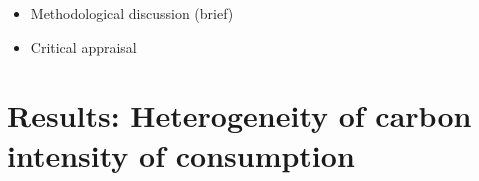 \documentclass[12pt, a4paper]{article}
\begin{document}
\begin{itemize}
    \item Methodological discussion (brief)
    \item Critical appraisal
\end{itemize}

\clearpage

\section{Results: Heterogeneity of carbon intensity of consumption} \label{sec:results}
\end{document}
